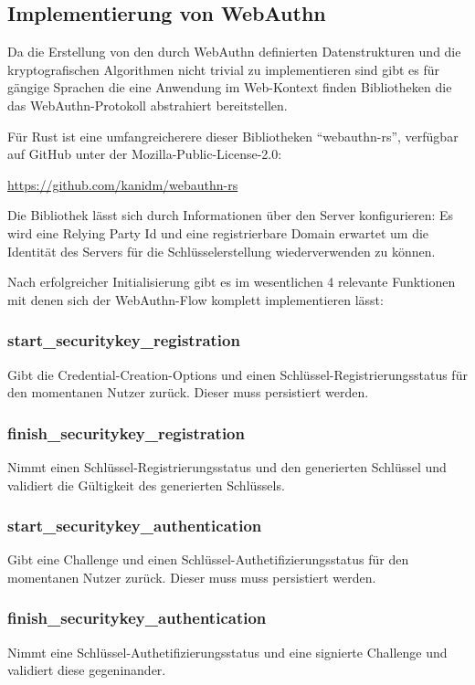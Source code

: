 \documentclass[journal]{IEEEtran}
\begin{document}
\subsection{Implementierung von WebAuthn}

Da die Erstellung von den durch WebAuthn definierten Datenstrukturen und die
kryptografischen Algorithmen nicht trivial zu implementieren sind gibt es für
gängige Sprachen die eine Anwendung im Web-Kontext finden Bibliotheken die das
WebAuthn-Protokoll abstrahiert bereitstellen.

Für Rust ist eine umfangreicherere dieser Bibliotheken ``webauthn-rs'',
verfügbar auf GitHub unter der Mozilla-Public-License-2.0:

\url{https://github.com/kanidm/webauthn-rs}

Die Bibliothek lässt sich durch Informationen über den Server konfigurieren:
Es wird eine Relying Party Id und eine registrierbare Domain erwartet um die
Identität des Servers für die Schlüsselerstellung wiederverwenden zu können.

Nach erfolgreicher Initialisierung gibt es im wesentlichen 4 relevante
Funktionen mit denen sich der WebAuthn-Flow komplett implementieren lässt:

\subsubsection{start\_securitykey\_registration}
Gibt die Credential-Creation-Options und einen Schlüssel-Registrierungsstatus
für den momentanen Nutzer zurück. Dieser muss persistiert werden.

\subsubsection{finish\_securitykey\_registration}
Nimmt einen Schlüssel-Registrierungsstatus und den generierten Schlüssel und
validiert die Gültigkeit des generierten Schlüssels.

\subsubsection{start\_securitykey\_authentication}
Gibt eine Challenge und einen Schlüssel-Authetifizierungsstatus für den
momentanen Nutzer zurück. Dieser muss muss persistiert werden.

\subsubsection{finish\_securitykey\_authentication}
Nimmt eine Schlüssel-Authetifizierungsstatus und eine signierte Challenge und
validiert diese gegeninander.
\end{document}
